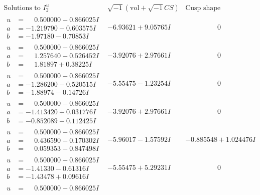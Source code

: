 \documentclass[1p]{elsarticle_modified}
\theoremstyle{definition}
\newcommand{\I}{\sqrt{-1}}
\begin{document}
$$\begin{array}{c|c|c}
\text{Solutions to }I^u_{2}& \I (\text{vol} + \sqrt{-1}CS) & \text{Cusp shape}\\
 \hline 
\begin{aligned}
u &= \phantom{-}0.500000 + 0.866025 I \\
a &= -1.219790 - 0.603575 I \\
b &= -1.97180 - 0.70853 I\end{aligned}
 & -6.93621 + 9.05765 I & \phantom{-0.000000 } 0 \\ \hline\begin{aligned}
u &= \phantom{-}0.500000 + 0.866025 I \\
a &= \phantom{-}1.257640 + 0.526452 I \\
b &= \phantom{-}1.81897 + 0.38225 I\end{aligned}
 & -3.92076 + 2.97661 I & \phantom{-0.000000 } 0 \\ \hline\begin{aligned}
u &= \phantom{-}0.500000 + 0.866025 I \\
a &= -1.286200 - 0.520515 I \\
b &= -1.88974 - 0.14726 I\end{aligned}
 & -5.55475 - 1.23254 I & \phantom{-0.000000 } 0 \\ \hline\begin{aligned}
u &= \phantom{-}0.500000 + 0.866025 I \\
a &= -1.413420 + 0.031776 I \\
b &= -0.852089 - 0.112425 I\end{aligned}
 & -3.92076 + 2.97661 I & \phantom{-0.000000 } 0 \\ \hline\begin{aligned}
u &= \phantom{-}0.500000 + 0.866025 I \\
a &= \phantom{-}0.436590 - 0.170302 I \\
b &= \phantom{-}0.059353 + 0.847498 I\end{aligned}
 & -5.96017 - 1.57592 I & -0.885548 + 1.024476 I \\ \hline\begin{aligned}
u &= \phantom{-}0.500000 + 0.866025 I \\
a &= -1.41330 - 0.61316 I \\
b &= -1.43478 + 0.09616 I\end{aligned}
 & -5.55475 + 5.29231 I & \phantom{-0.000000 } 0 \\ \hline\begin{aligned}
u &= \phantom{-}0.500000 + 0.866025 I \\

\end{aligned}
\end{array}$$
\end{document}
